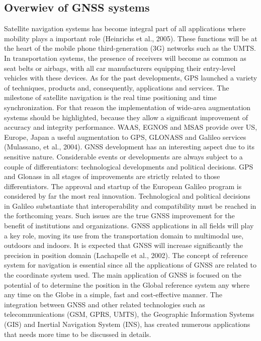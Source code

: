 \subsection{Overwiev of GNSS systems}
Satellite navigation systems has become integral part of all applications where mobility plays a
important role (Heinrichs et al., 2005). These functions will be at the heart of the mobile phone
third-generation (3G) networks such as the UMTS. In transportation systems, the presence of
receivers will become as common as seat belts or airbags, with all car manufacturers equipping
their entry-level vehicles with these devices.
As for the past developments, GPS launched a variety of techniques, products and, consequently,
applications and services. The milestone of satellite navigation is the real time positioning and
time synchronization. For that reason the implementation of wide-area augmentation systems
should be highlighted, because they allow a significant improvement of accuracy and integrity
performance. WAAS, EGNOS and MSAS provide over US, Europe, Japan a useful
augmentation to GPS, GLONASS and Galileo services (Mulassano, et al., 2004).
GNSS development has an interesting aspect due to its sensitive nature. Considerable events or
developments are always subject to a couple of differentiators: technological developments and
political decisions.
GPS and Glonass in all stages of improvements are strictly related to those differentiators. The
approval and startup of the European Galileo program is considered by far the most real
innovation. Technological and political decisions in Galileo substantiate that interoperability and
compatibility must be reached in the forthcoming years. Such issues are the true GNSS
improvement for the benefit of institutions and organizations.
GNSS applications in all fields will play a key role, moving its use from the transportation
domain to multimodal use, outdoors and indoors. It is expected that GNSS will increase
significantly the precision in position domain (Lachapelle et al., 2002).
The concept of reference system for navigation is essential since all the applications of GNSS are
related to the coordinate system used. The main application of GNSS is focused on the potential
of to determine the position in the Global reference system any where any time on the Globe in a
simple, fast and cost-effective manner.
The integration between GNSS and other related technologies such as telecommunications
(GSM, GPRS, UMTS), the Geographic Information Systems (GIS) and Inertial Navigation
System (INS), has created numerous applications that needs more time to be discussed in details.

